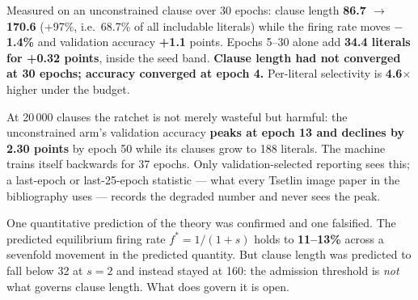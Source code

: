 Measured on an unconstrained clause over 30 epochs: clause length \textbf{86.7 $\to$ 170.6}
(+97\%, i.e.\ 68.7\% of all includable literals) while the firing rate moves \textbf{$-$1.4\%} and
validation accuracy \textbf{+1.1} points. Epochs 5--30 alone add \textbf{34.4 literals for +0.32
points}, inside the seed band. \textbf{Clause length had not converged at 30 epochs; accuracy
converged at epoch 4.} Per-literal selectivity is \textbf{4.6$\times$} higher under the budget.

At 20\,000 clauses the ratchet is not merely wasteful but harmful: the unconstrained arm's validation
accuracy \textbf{peaks at epoch 13 and declines by 2.30 points} by epoch 50 while its clauses grow to
188 literals. The machine trains itself backwards for 37 epochs. Only validation-selected reporting
sees this; a last-epoch or last-25-epoch statistic --- what every Tsetlin image paper in the
bibliography uses --- records the degraded number and never sees the peak.

One quantitative prediction of the theory was confirmed and one falsified. The predicted equilibrium
firing rate $f^{*}=1/(1+s)$ holds to \textbf{11--13\%} across a sevenfold movement in the predicted
quantity. But clause length was predicted to fall below 32 at $s{=}2$ and instead stayed at 160: the
admission threshold is \emph{not} what governs clause length. What does govern it is open.
